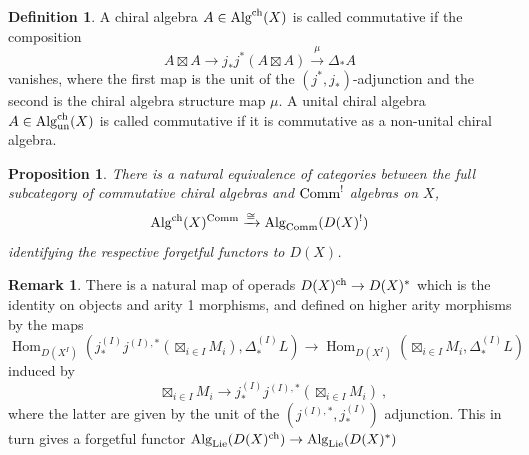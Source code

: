 \documentclass[11pt]{amsart}
\numberwithin{equation}{section}
\newtheorem{prop}[theo]{Proposition}
\theoremstyle{definition}
\newtheorem{defn}[theo]{Definition}
\newtheorem{rmk}[theo]{Remark}
\newcommand{\mc}{\mathcal}
\newcommand{\D}{{\mathcal{D}}}
\DeclareMathOperator{\Hom}{Hom}
\newcommand{\Alg}{{\textup{Alg}}}
\newcommand{\Comm}{{\textup{Comm}}}
\newcommand{\Lie}{{\textup{Lie}}}
\newcommand{\ch}{{\textup{ch}}}
\newcommand{\boxt}{{{\boxtimes }}}
\newcommand{\un}{{\textup{un}}}
\newcommand{\0}{{\textbf{0}}}
\newcommand{\DD}{{D}}
\def\ch{{\rm ch}}
\newcommand{\Cent}{{\textup{Cent}}}
\newcommand{\Ann}{{\textup{Ann}}}
\begin{document}
%
%
%
%
%
%
%
\begin{defn}\label{commchalg} A chiral algebra $A \in \Alg^\ch(X)$ is called commutative if the composition
	$$ A \boxt A \to j_*j^*(A \boxt A) \xrightarrow{\mu} \Delta_*A $$
	vanishes, where the first map is the unit of the $(j^*,j_*)$-adjunction and the second is the chiral algebra structure map $\mu$. A unital chiral algebra $A \in \Alg_\un^\ch(X)$ is called commutative if it is commutative as a non-unital chiral algebra.
\end{defn}


\begin{prop} There is a natural equivalence of categories between the full subcategory of commutative chiral algebras and $\Comm^!$ algebras on $X$,
\[\Alg^\ch(X)^\Comm \xrightarrow{\cong} \Alg_\Comm(\DD(X)^!) \]
identifying the respective forgetful functors to $\DD(X)$.
\end{prop}





\begin{rmk}\label{chiraltostar} There is a natural map of operads $\DD(X)^\ch\to \DD(X)^*$ which is the identity on objects and arity 1 morphisms, and defined on higher arity morphisms by the maps
	$$  \Hom_{\DD(X^I)}(j^{(I)}_*j^{(I),*} (\boxt_{i\in I} M_i) , \Delta^{(I)}_* L) \to \Hom_{\DD(X^I)}(\boxt_{i\in I} M_i , \Delta^{(I)}_* L)$$
	induced by
	$$\quad\quad \boxtimes_{i\in I} M_i \to  j^{(I)}_*j^{(I),*} (\boxt_{i\in I} M_i) \ , $$
	where the latter are given by the unit of the $(j^{(I),*}, j^{(I)}_*)$ adjunction. This in turn gives a forgetful functor $\Alg_{\Lie}(\DD(X)^\ch)\rightarrow \Alg_{\Lie}(\DD(X)^*)$
\end{rmk}
\end{document}
